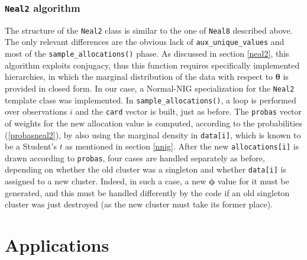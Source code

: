 \section{\texttt{Neal2} algorithm}
The structure of the \verb|Neal2| class is similar to the one of \verb|Neal8| described above.
The only relevant differences are the obvious lack of \verb|aux_unique_values| and most of the \verb|sample_allocations()| phase.
As discussed in section \ref{neal2}, this algorithm exploits conjugacy, thus this function requires specifically implemented hierarchies, in which the marginal distribution of the data with respect to $\boldsymbol\theta$ is provided in closed form.
In our case, a Normal-NIG specialization for the \verb|Neal2| template class was implemented.
In \verb|sample_allocations()|, a loop is performed over observations $i$ and the \verb|card| vector is built, just as before.
The \verb|probas| vector of weights for the new allocation value is computed, according to the probabilities (\ref{probasneal2}), by also using the marginal density in \verb|data[i]|, which is known to be a Student's $t$ as mentioned in section \ref{nnig}.
After the new \verb|allocations[i]| is drawn according to \verb|probas|, four cases are handled separately as before, depending on whether the old cluster was a singleton and whether \verb|data[i]| is assigned to a new cluster.
Indeed, in such a case, a new $\boldsymbol\phi$ value for it must be generated, and this must be handled differently by the code if an old singleton cluster was just destroyed (as the new cluster must take its former place).





\part{Applications}

